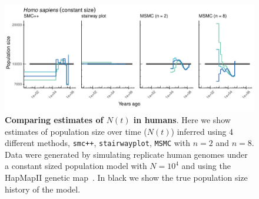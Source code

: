 \documentclass[12pt,halfline,a4paper]{ouparticle}
\newcommand{\MSMC}{\texttt{MSMC}\xspace}
\newcommand{\smcpp}{\texttt{smc++}\xspace}
\begin{document}
\begin{figure}
\begin{center}
\includegraphics[width=0.8\linewidth]{display_items/homo_sapiens_constant.pdf}
\caption{\textbf{Comparing estimates of $N(t)$ in humans}. Here we show estimates of population
size over time ($N(t)$) inferred using 4 different methods, \smcpp, \texttt{stairwayplot},
\MSMC with $n=2$ and $n=8$. Data were generated by simulating
replicate human genomes under a constant sized population model with $N=10^4$ and using the
HapMapII genetic map~\citep{international2007second}. In black we show the true population size history
of the model.}
\label{fig:n_t_HomSap_constant}
\end{center}
\end{figure}
\end{document}

